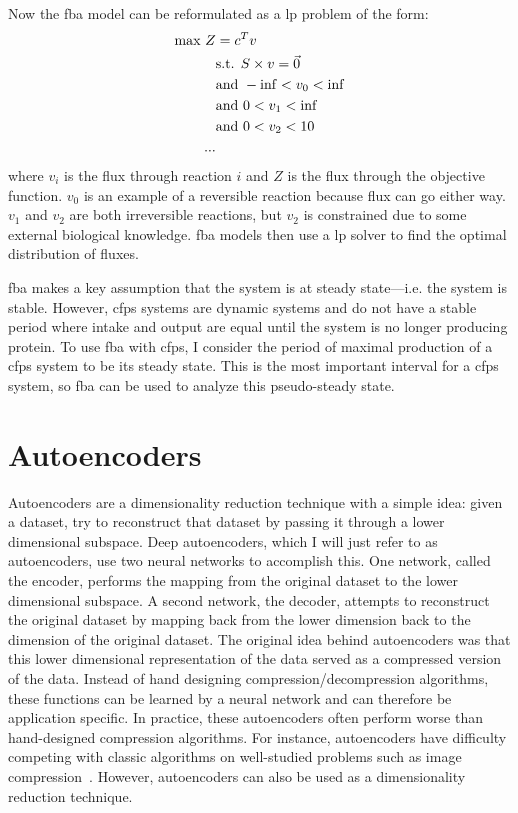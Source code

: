 Now the \gls{fba} model can be reformulated as a \gls{lp} problem of the form:
\begin{equation}
\centering
\begin{split}
\text{max } Z &= c^Tv \\
&\text{s.t. } S \times v = \vec{0} \\
&\text{and } -\inf < v_0 < \inf \\
&\text{and } 0 < v_1 < \inf \\
&\text{and } 0 < v_2 < 10 \\
...
\end{split}
\end{equation}
where $v_i$ is the flux through reaction $i$ and $Z$ is the flux through the objective function.
$v_0$ is an example of a reversible reaction because flux can go either way.
$v_1$ and $v_2$ are both irreversible reactions, but $v_2$ is constrained due to some external biological knowledge.
\gls{fba} models then use a \gls{lp} solver to find the optimal distribution of fluxes.

\gls{fba} makes a key assumption that the system is at steady state---i.e. the system is stable.
However, \gls{cfps} systems are dynamic systems and do not have a stable period where intake and output are equal until the system is no longer producing protein.
To use \gls{fba} with \gls{cfps}, I consider the period of maximal production of a \gls{cfps} system to be its steady state.
This is the most important interval for a \gls{cfps} system, so \gls{fba} can be used to analyze this pseudo-steady state.

\section{Autoencoders}
Autoencoders are a dimensionality reduction technique with a simple idea: given a dataset, try to reconstruct that dataset by passing it through a lower dimensional subspace.
Deep autoencoders, which I will just refer to as autoencoders, use two neural networks to accomplish this.
One network, called the encoder, performs the mapping from the original dataset to the lower dimensional subspace.
A second network, the decoder, attempts to reconstruct the original dataset by mapping back from the lower dimension back to the dimension of the original dataset.
The original idea behind autoencoders was that this lower dimensional representation of the data served as a compressed version of the data.
Instead of hand designing compression/decompression algorithms, these functions can be learned by a neural network and can therefore be application specific.
In practice, these autoencoders often perform worse than hand-designed compression algorithms.
For instance, autoencoders have difficulty competing with classic algorithms on well-studied problems such as image compression~\cite{theis2017lossy}.
However, autoencoders can also be used as a dimensionality reduction technique.

